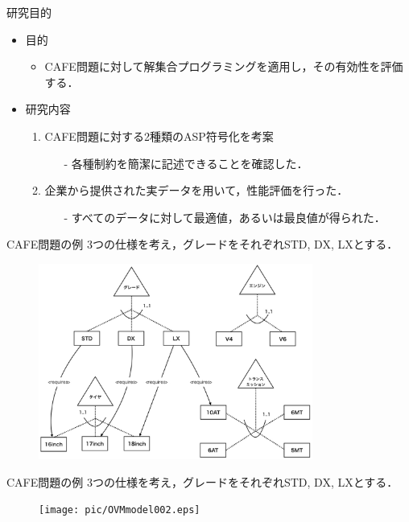 \documentclass[dvipdfmx, 11pt]{beamer}
\begin{document}
\begin{frame}{研究目的}
\begin{itemize}
	\setlength{\itemsep}{20pt}
	\item 目的
  	\begin{itemize}
   		\item CAFE問題に対して解集合プログラミングを適用し，その有効性を評価する．
  	\end{itemize}
  	\item 研究内容
  	\begin{enumerate}
		\setlength{\itemsep}{8pt}
   		\item CAFE問題に対する2種類のASP符号化を考案
   		\begin{itemize}
			\item[-] 各種制約を簡潔に記述できることを確認した．
		\end{itemize}
   		\item 企業から提供された実データを用いて，性能評価を行った．
		\begin{itemize}
			\item[-] すべてのデータに対して最適値，あるいは最良値が得られた．
		\end{itemize}
  	\end{enumerate}
\end{itemize}
\end{frame}
\begin{frame}{CAFE問題の例}
	3つの仕様を考え，グレードをそれぞれSTD, DX, LXとする．
	\begin{center}
	\begin{figure}
	\includegraphics[width=9cm]{pic/OVMmodel001.eps}
	\end{figure}
	\end{center}
\end{frame}
\begin{frame}{CAFE問題の例}
	3つの仕様を考え，グレードをそれぞれSTD, DX, LXとする．
	\begin{center}
	\begin{figure}
	\texttt{[image: pic/OVMmodel002.eps]}
	\end{figure}
	\end{center}
\end{frame}
\end{document}
